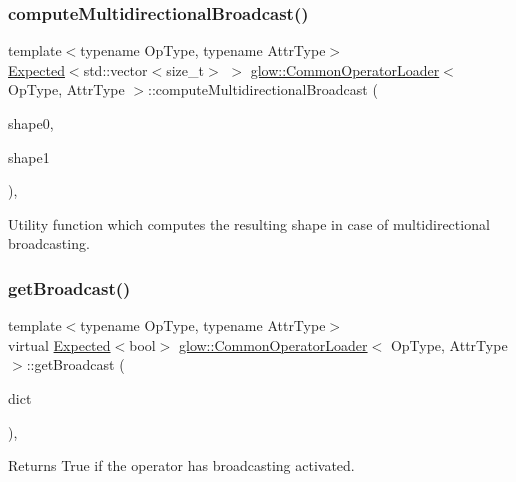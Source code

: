 \subsubsection{\texorpdfstring{compute\+Multidirectional\+Broadcast()}{computeMultidirectionalBroadcast()}}
{\footnotesize\ttfamily template$<$typename Op\+Type, typename Attr\+Type$>$ \\
\hyperlink{classglow_1_1detail_1_1_glow_expected}{Expected}$<$std\+::vector$<$size\+\_\+t$>$ $>$ \hyperlink{classglow_1_1_common_operator_loader}{glow\+::\+Common\+Operator\+Loader}$<$ Op\+Type, Attr\+Type $>$\+::compute\+Multidirectional\+Broadcast (\begin{DoxyParamCaption}\item[{llvm\+::\+Array\+Ref$<$ size\+\_\+t $>$}]{shape0,  }\item[{llvm\+::\+Array\+Ref$<$ size\+\_\+t $>$}]{shape1 }\end{DoxyParamCaption})\hspace{0.3cm}{\ttfamily [inline]}, {\ttfamily [protected]}}

Utility function which computes the resulting shape in case of multidirectional broadcasting. \mbox{\label{classglow_1_1_common_operator_loader_ac5ce8fc378bb2526f7f957e13a54e970}} 
\subsubsection{\texorpdfstring{get\+Broadcast()}{getBroadcast()}}
{\footnotesize\ttfamily template$<$typename Op\+Type, typename Attr\+Type$>$ \\
virtual \hyperlink{classglow_1_1detail_1_1_glow_expected}{Expected}$<$bool$>$ \hyperlink{classglow_1_1_common_operator_loader}{glow\+::\+Common\+Operator\+Loader}$<$ Op\+Type, Attr\+Type $>$\+::get\+Broadcast (\begin{DoxyParamCaption}\item[{const Argument\+Dictionary\+Ty \&}]{dict }\end{DoxyParamCaption})\hspace{0.3cm}{\ttfamily [protected]}, {}}

\begin{DoxyReturn}{Returns}
True if the operator has broadcasting activated. 
\end{DoxyReturn}
\mbox{\label{classglow_1_1_common_operator_loader_a4e079eed244e7047b09040ca209d15e0}} 
